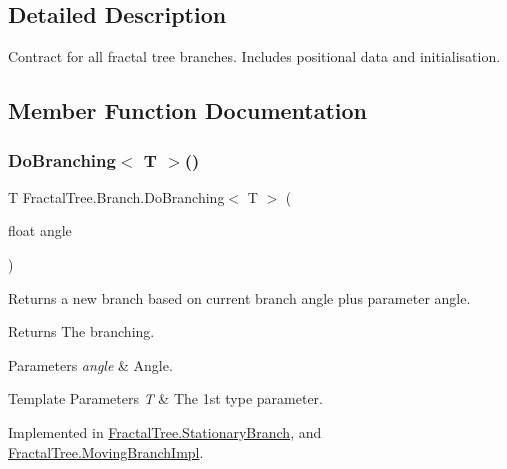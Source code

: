 \subsection{Detailed Description}
Contract for all fractal tree branches. Includes positional data and initialisation. 



\subsection{Member Function Documentation}
\mbox{\label{interface_fractal_tree_1_1_branch_ad3240d5e5d13df2ee22e55892f9c03cd}} 
\subsubsection{\texorpdfstring{Do\+Branching$<$ T $>$()}{DoBranching< T >()}}
{\footnotesize\ttfamily T Fractal\+Tree.\+Branch.\+Do\+Branching$<$ T $>$ (\begin{DoxyParamCaption}\item[{float}]{angle }\end{DoxyParamCaption})}



Returns a new branch based on current branch angle plus parameter angle. 

\begin{DoxyReturn}{Returns}
The branching.
\end{DoxyReturn}

\begin{DoxyParams}{Parameters}
{\em angle} & Angle.\\
\hline
\end{DoxyParams}

\begin{DoxyTemplParams}{Template Parameters}
{\em T} & The 1st type parameter.\\
\hline
\end{DoxyTemplParams}


Implemented in \hyperlink{class_fractal_tree_1_1_stationary_branch_a57ff42d0c4793c0c40aa1671905bf222}{Fractal\+Tree.\+Stationary\+Branch}, and \hyperlink{class_fractal_tree_1_1_moving_branch_impl_a7f7776446fa70aac8efb669f9e41a4af}{Fractal\+Tree.\+Moving\+Branch\+Impl}.

